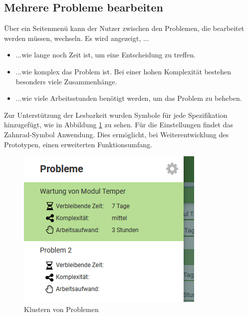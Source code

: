 \subsection{Mehrere Probleme bearbeiten}
Über ein Seitenmenü kann der Nutzer zwischen den Problemen, die bearbeitet werden müssen, wechseln. Es wird angezeigt, ...
\begin{itemize}
\item ...wie lange noch Zeit ist, um eine Entscheidung zu treffen.
\item ...wie komplex das Problem ist. Bei einer hohen Komplexität bestehen besonders viele Zusammenhänge.
\item ...wie viele Arbeitsstunden benötigt werden, um das Problem zu beheben.
\end{itemize}
Zur Unterstützung der Lesbarkeit wurden Symbole für jede Spezifikation hinzugefügt, wie in Abbildung \ref{pic:pD-Probleme-klustern} zu sehen. Für die Einstellungen findet das Zahnrad-Symbol Anwendung. Dies ermöglicht, bei Weiterentwicklung des Prototypen, einen erweiterten Funktionsumfang.
\begin{figure}[htbp]
\centering
\vspace{0,2cm}
\includegraphics[scale=0.7]{DA_files/Bilder/Konzept/Skizze-Klustern-Problem.png}
\caption{Klustern von Problemen}
\label{pic:pD-Probleme-klustern}
\end{figure}